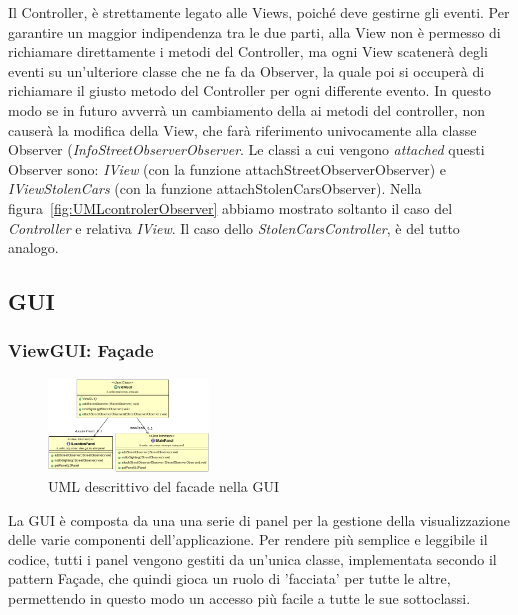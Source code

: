 \documentclass[a4paper,12pt]{report}
\begin{document}
      Il Controller, è strettamente legato alle Views, poiché 
deve gestirne gli eventi. Per garantire un maggior indipendenza tra le due 
parti, alla View non è permesso di richiamare direttamente i metodi del 
Controller, ma ogni View scatenerà degli eventi su un'ulteriore classe che ne 
fa da Observer, la quale poi si occuperà di richiamare il giusto metodo del 
Controller per ogni differente evento. In questo modo se in futuro avverrà un 
cambiamento della ai metodi del controller, non causerà la modifica della View, 
che farà riferimento univocamente alla classe Observer 
(\textit{InfoStreetObserverObserver}. 
Le classi a cui vengono \textit{attached} questi Observer sono: 
\textit{IView} (con la funzione attachStreetObserverObserver) e
\textit{IViewStolenCars} (con la funzione attachStolenCarsObserver). Nella 
figura~\ref{fig:UMLcontrolerObserver} abbiamo mostrato soltanto il caso del 
\textit{Controller} e relativa \textit{IView}. Il caso dello 
\textit{StolenCarsController}, è del tutto analogo.
\clearpage
  \subsection{GUI}
    \subsubsection {ViewGUI: Façade}
    \begin{figure}
      \vspace{-80pt}
      \begin{center}
	  \includegraphics[width=0.38\textwidth]{images/UMLviewFacade}
	\caption{UML descrittivo del facade nella GUI}
	\label{fig:UMLviewFacade}
      \end{center}
      \vspace{-10pt}
    \end{figure}

     La GUI è composta da una una serie di panel per la gestione della 
visualizzazione delle varie componenti dell'applicazione. Per rendere più 
semplice e leggibile il codice, tutti i panel vengono gestiti da un'unica 
classe, implementata secondo il pattern Façade, che quindi gioca un ruolo di 
'facciata' per tutte le altre, permettendo in questo modo un accesso più 
facile a tutte le sue sottoclassi.
\end{document}
